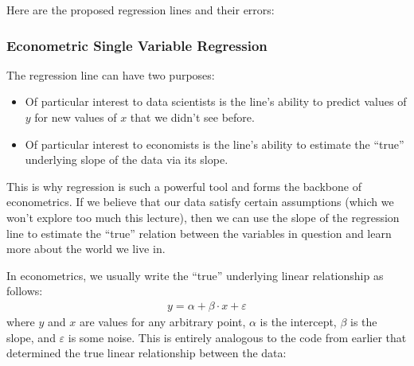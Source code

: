 \documentclass[letterpaper,10pt,english]{jupyterBook}
\begin{document}
\sphinxAtStartPar
Here are the proposed regression lines and their errors:






\subsubsection{Econometric Single Variable Regression}
\label{\detokenize{content/11-econometrics/single-variable:econometric-single-variable-regression}}
\sphinxAtStartPar
The regression line can have two purposes:
\begin{itemize}
\item {} 
\sphinxAtStartPar
Of particular interest to data scientists is the line’s ability to predict values of \(y\) for new values of \(x\) that we didn’t see before.

\item {} 
\sphinxAtStartPar
Of particular interest to economists is the line’s ability to estimate the “true” underlying slope of the data via its slope.

\end{itemize}

\sphinxAtStartPar
This is why regression is such a powerful tool and forms the backbone of econometrics. If we believe that our data satisfy certain assumptions (which we won’t explore too much this lecture), then we can use the slope of the regression line to estimate the “true” relation between the variables in question and learn more about the world we live in.

\sphinxAtStartPar
In econometrics, we usually write the “true” underlying linear relationship as follows:
\begin{equation*}
\begin{split}
y = \alpha + \beta \cdot x + \varepsilon
\end{split}
\end{equation*}
\sphinxAtStartPar
where \(y\) and \(x\) are values for any arbitrary point, \(\alpha\) is the intercept, \(\beta\) is the slope, and \(\varepsilon\) is some noise. This is entirely analogous to the code from earlier that determined the true linear relationship between the data:

\begin{sphinxVerbatim}[commandchars=\\\{\}]
      
\end{sphinxVerbatim}
\end{document}

